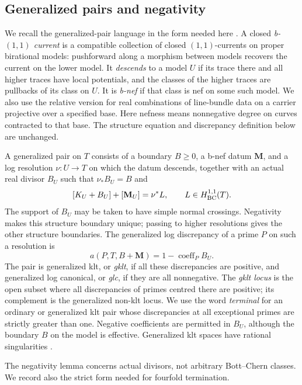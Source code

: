 \subsection{Generalized pairs and negativity}

We recall the generalized-pair language in the form needed here
\cite[Section~2.1 and Definition~2.7]{DHY2023}.  A closed \emph{b-$(1,1)$
current} is a compatible collection of closed $(1,1)$-currents on
proper birational models: pushforward along a morphism between models
recovers the current on the lower model.  It \emph{descends} to a
model $U$ if its trace there and all higher traces have local
potentials, and the classes of the higher traces are pullbacks of
its class on $U$.
It is \emph{b-nef} if that class is nef on some such model.
We also use the relative version for real combinations of line-bundle
data on a carrier projective over a specified base.  Here nefness
means nonnegative degree on curves contracted to that base.  The
structure equation and discrepancy definition below are unchanged.

A generalized pair on $T$ consists of a boundary $B\geq0$, a b-nef
datum $\mathbf M$, and a log resolution $\nu:U\to T$ on which the
datum descends, together with an actual real divisor $B_U$ such that
$\nu_*B_U=B$ and
\begin{equation}\label{eq:generalized-structure}
 [K_U+B_U]+[\mathbf M_U]=\nu^*L,
 \qquad L\in H^{1,1}_{\mathrm{BC}}(T).
\end{equation}
The support of $B_U$ may be taken to have simple normal crossings.
Negativity makes this structure boundary unique; passing to higher
resolutions gives the other structure boundaries.  The generalized
log discrepancy of a prime $P$ on such a resolution is
\[
 a(P,T,B+\mathbf M)=1-\operatorname{coeff}_P B_U.
\]
The pair is generalized klt, or \emph{gklt}, if all these discrepancies
are positive, and generalized log canonical, or \emph{glc}, if they
are all nonnegative.  The \emph{gklt locus} is the open subset where
all discrepancies of primes centred there are positive; its
complement is the generalized non-klt locus.  We use the word
\emph{terminal} for an ordinary or
generalized klt pair whose discrepancies at all exceptional primes
are strictly greater than one.  Negative coefficients are permitted
in $B_U$, although the boundary $B$ on the model is effective.
Generalized klt spaces have rational singularities
\cite[Theorem~2.19]{DHY2023}.

The negativity lemma concerns actual divisors, not arbitrary
Bott--Chern classes.  We record also the strict form needed for
fourfold termination.

